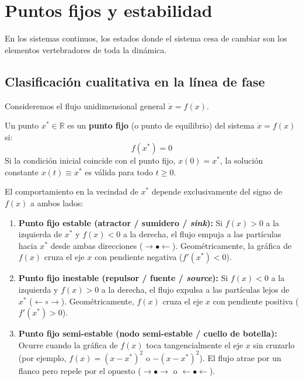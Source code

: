 \section{Puntos fijos y estabilidad}
\label{sec:puntos_fijos}

En los sistemas continuos, los estados donde el sistema cesa de cambiar son los elementos vertebradores de toda la dinámica.

\subsection{Clasificación cualitativa en la línea de fase}

Consideremos el flujo unidimensional general $\dot{x} = f(x)$.

\begin{definition}
    Un punto $x^* \in \mathbb{R}$ es un \textbf{punto fijo} (o punto de equilibrio) del sistema $\dot{x} = f(x)$ si:
    \begin{equation}
        f(x^*) = 0
    \end{equation}
    Si la condición inicial coincide con el punto fijo, $x(0) = x^*$, la solución constante $x(t) \equiv x^*$ es válida para todo $t \ge 0$.
\end{definition}

El comportamiento en la vecindad de $x^*$ depende exclusivamente del signo de $f(x)$ a ambos lados:

\begin{enumerate}
    \item \textbf{Punto fijo estable (atractor / sumidero / \emph{sink}):} Si $f(x) > 0$ a la izquierda de $x^*$ y $f(x) < 0$ a la derecha, el flujo empuja a las partículas hacia $x^*$ desde ambas direcciones ($\to \bullet \leftarrow$). Geométricamente, la gráfica de $f(x)$ cruza el eje $x$ con pendiente negativa ($f'(x^*) < 0$).
    \item \textbf{Punto fijo inestable (repulsor / fuente / \emph{source}):} Si $f(x) < 0$ a la izquierda y $f(x) > 0$ a la derecha, el flujo expulsa a las partículas lejos de $x^*$ ($\leftarrow \circ \to$). Geométricamente, $f(x)$ cruza el eje $x$ con pendiente positiva ($f'(x^*) > 0$).
    \item \textbf{Punto fijo semi-estable (nodo semi-estable / cuello de botella):} Ocurre cuando la gráfica de $f(x)$ toca tangencialmente el eje $x$ sin cruzarlo (por ejemplo, $f(x) = (x-x^*)^2$ o $-(x-x^*)^2$). El flujo atrae por un flanco pero repele por el opuesto ($\to \bullet \to$ o $\leftarrow \bullet \leftarrow$).
\end{enumerate}

